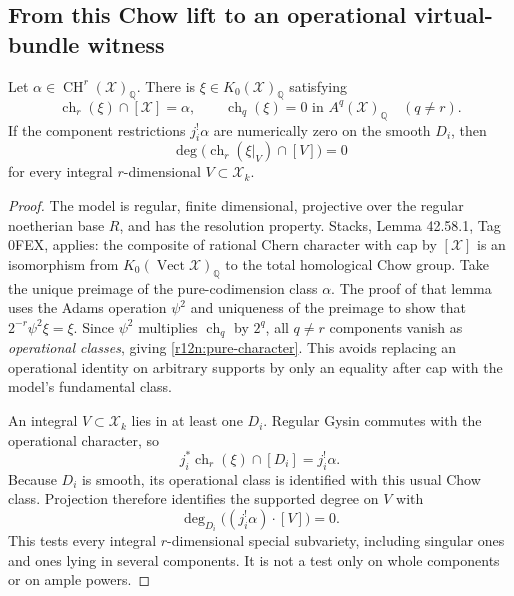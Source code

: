 \subsection{From this Chow lift to an operational virtual-bundle witness}

\begin{lemma}
\label{r12n:K0}
Let $\alpha\in\operatorname{CH}^r(\mathcal X)_{\mathbb Q}$.  There is
$\xi\in K_0(\mathcal X)_{\mathbb Q}$ satisfying
\[
 \operatorname{ch}_r(\xi)\cap[\mathcal X]=\alpha,
 \qquad \operatorname{ch}_q(\xi)=0\text{ in }A^q(\mathcal X)_{\mathbb Q}
                 \quad(q\ne r).
\tag{NL20}\label{r12n:pure-character}
\]
If the component restrictions $j_i^!\alpha$ are numerically zero on
the smooth $D_i$, then
\[
          \deg\bigl(\operatorname{ch}_r(\xi|_V)\cap[V]\bigr)=0
\]
for every integral $r$-dimensional $V\subset\mathcal X_k$.
\end{lemma}

\begin{proof}
The model is regular, finite dimensional, projective over the regular
noetherian base $R$, and has the resolution property.  Stacks,
Lemma 42.58.1, Tag 0FEX, applies: the composite of rational Chern
character with cap by $[\mathcal X]$ is an isomorphism from
$K_0(\operatorname{Vect}\mathcal X)_{\mathbb Q}$ to the total
homological Chow group.  Take the unique preimage of the
pure-codimension class $\alpha$.  The proof of that lemma uses the
Adams operation $\psi^2$ and uniqueness of the preimage to show that
$2^{-r}\psi^2\xi=\xi$.  Since $\psi^2$ multiplies
$\operatorname{ch}_q$ by $2^q$, all $q\ne r$ components vanish as
\emph{operational classes}, giving \eqref{r12n:pure-character}.
This avoids replacing an operational identity on arbitrary supports
by only an equality after cap with the model's fundamental class.

An integral $V\subset\mathcal X_k$ lies in at least one $D_i$.
Regular Gysin commutes with the operational character, so
\[
       j_i^*\operatorname{ch}_r(\xi)\cap[D_i]=j_i^!\alpha.
\]
Because $D_i$ is smooth, its operational class is identified with
this usual Chow class.  Projection therefore identifies the
supported degree on $V$ with
\[
                    \deg_{D_i}\bigl((j_i^!\alpha)\cdot[V]\bigr)=0.
\]
This tests every integral $r$-dimensional special subvariety,
including singular ones and ones lying in several components.
It is not a test only on whole components or on ample powers.
\end{proof}

